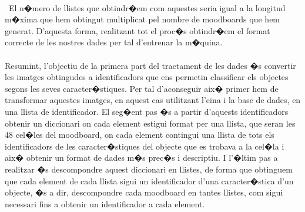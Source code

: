 \documentclass[12pt,a4paper,openright,oneside]{article}
\numberwithin{equation}{section}
\theoremstyle{definition}
\begin{document}
\\\ El n�mero de llistes que obtindr�em com aquestes seria igual a la longitud m�xima que hem obtingut multiplicat pel nombre de moodboards que hem generat. D'aquesta forma, realitzant tot el proc�s obtindr�em el format correcte de les nostres dades per tal d'entrenar la m�quina.
\\\\Resumint, l'objectiu de la primera part del tractament de les dades �s convertir les imatges obtingudes a identificadors que ens permetin classificar els objectes segons les seves caracter�stiques. Per tal d'aconseguir aix� primer hem de transformar aquestes imatges, en aquest cas utilitzant l'eina i la base de dades, en una llista de identificador. El seg�ent pas �s a partir d'aquests identificadors obtenir un diccionari on cada element estigui format per una llista, que seran les 48 cel�les del moodboard, on cada element contingui una llista de tots els identificadors de les caracter�stiques del objecte que es trobava a la cel�la i aix� obtenir un format de dades m�s prec�s i descriptiu. I l'�ltim pas a realitzar �s descompondre aquest diccionari en llistes, de forma que obtinguem que cada element de cada llista sigui un identificador d'una caracter�stica d'un objecte, �s a dir, descompondre cada moodboard en tantes llistes, com sigui necessari fins a obtenir un identificador a cada element.
\end{document}
